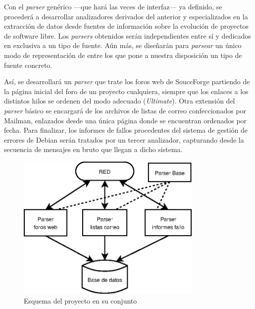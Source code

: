 Con el \textit{parser} genérico ---que hará las veces de interfaz---
ya definido, se procederá a desarrollar analizadores derivados del anterior
y especializados en la extracción de datos desde fuentes de información
sobre la evolución de proyectos de software libre. Los \textit{parsers}
obtenidos serán independientes entre sí y dedicados en exclusiva a un tipo
de fuente. Aún más, se diseñarán para \textit{parsear} un único modo de
representación de entre los que pone a nuestra disposición un tipo de fuente
concreto.

Así, se desarrollará un \textit{parser} que trate los foros web de SouceForge
partiendo de la página inicial del foro de un proyecto cualquiera, siempre
que los enlaces a los distintos hilos se ordenen del modo adecuado (\textit{Ultimate}).
Otra extensión del \textit{parser} básico se encargará de los archivos de
listas de correo confeccionados por Mailman, enlazados desde una única página
donde se encuentran ordenados por fecha.
Para finalizar, los informes de fallos procedentes del sistema de gestión de
errores de Debian serán tratados por un tercer analizador, capturando desde
la secuencia de mensajes en bruto que llegan a dicho sistema.

\begin{figure}[H]
  \centering
  \includegraphics[width=9cm, keepaspectratio]{img/arquitectura2}
  \caption{Esquema del proyecto en su conjunto}
  \label{figura:arquitectura2}
\end{figure}

